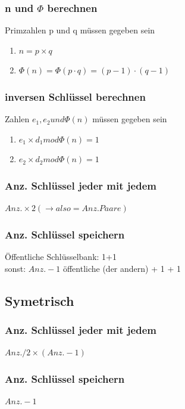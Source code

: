 \subsubsection{ n und $\Phi$ berechnen}
Primzahlen p und q müssen gegeben sein
\begin{enumerate}
    \item $n = p \times q$
    \item $\Phi(n)=\Phi(p \cdot q)=(p-1) \cdot(q-1)$
\end{enumerate}

\subsubsection{inversen Schlüssel berechnen}
Zahlen $e_1, e_2 und \Phi(n)$ müssen gegeben sein
\begin{enumerate}
    \item $e_1 \times d_1 mod \Phi(n) = 1$
    \item $e_2 \times d_2 mod \Phi(n) = 1$
\end{enumerate}

\subsubsection{Anz. Schlüssel jeder mit jedem}
$Anz. \times 2 (\rightarrow also = Anz. Paare)$


\subsubsection{Anz. Schlüssel speichern}
Öffentliche Schlüsselbank: 1+1\\
sonst: $Anz. - 1$ öffentliche (der andern) + 1 + 1

\subsection{Symetrisch}
\subsubsection{Anz. Schlüssel jeder mit jedem}
$Anz. / 2 \times (Anz. -1)$


\subsubsection{Anz. Schlüssel speichern}
$Anz. - 1$

\vfill
$$
\columnbreak
